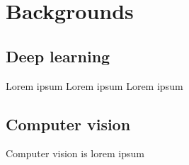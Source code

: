 \chapter{Backgrounds}
\section{Deep learning}
Lorem ipsum Lorem ipsum Lorem ipsum

\section{Computer vision}

Computer vision is lorem ipsum
